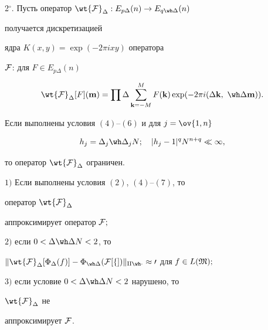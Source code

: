  


2${}^\circ$. Пусть оператор $\wt{\cal F}_\Delta:E_{p\Delta}(n)\to 


E_{q\wh\Delta}(n)$ 


получается дискретизацией 


ядра $K(x,y)=\exp(-2\pi i xy)$ оператора 


$\cal F$: для $F\in E_{p\Delta}(n)$ 


$$ 


\wt{\cal F}_\Delta[F](\bold m)=\prod\Delta 


\sum^M_{\bold k=-M}F(\bold k)\exp 


(-2\pi i(\Delta\bold k,\ \wh\Delta\bold m)). 


$$ 


 


\begin{prop} Если выполнены условия $(4)$--$(6)$ и для $j=\ov{1,n}$ 


\begin{equation} 


h_j=\Delta_j\wh\Delta_j N;\quad 


|h_j-1|^q N^{n+q}\ll\infty, 


\end{equation} 


то оператор $\wt{\cal F}_\Delta$ ограничен. 


\end{prop} 


 


\begin{thm} $1)$ Если выполнены условия $(2)$, $(4)$--$(7)$, то 


оператор $\wt{\cal F}_\Delta$ 


аппроксимирует оператор $\cal F;$ 


 


$2)$ если $0<\Delta\wh\Delta N<2$, то 


$\|\wt{\cal F}_\Delta[\Phi_\Delta(f)]-\Phi_{\wh\Delta}(\cal F[f]) 


\|_{q\wh\Delta}\approx 0$ для $f\in L(\frak M);$ 


 


$3)$ если условие $0<\Delta\wh\Delta N<2$ нарушено, то 


$\wt{\cal F}_\Delta$ не 


аппроксимирует $\cal F$. 


\end{thm} 



